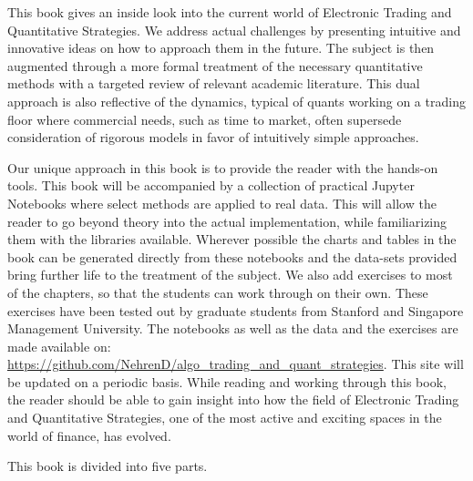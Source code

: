 This book gives an inside look into the current world of Electronic Trading and Quantitative Strategies. We address actual challenges by presenting intuitive and innovative ideas on how to approach them in the future. The subject is then augmented through a more formal treatment of the necessary quantitative methods with a targeted review of relevant academic literature. This dual approach is also reflective of the dynamics, typical of quants working on a trading floor where commercial needs, such as time to market, often supersede consideration of rigorous models in favor of intuitively simple approaches. 


Our unique approach in this book is to provide the reader with the hands-on tools. This book will be accompanied by a collection of practical Jupyter Notebooks where select methods are applied to real data. This will allow the reader to go beyond theory into the actual implementation, while familiarizing them with the libraries available. Wherever possible the charts and tables in the book can be generated directly from these notebooks and the data-sets provided bring further life to the treatment of the subject. We also add exercises to most of the chapters, so that the students can work through on their own. These exercises have been tested out by graduate students from Stanford and Singapore Management University. The notebooks as well as the data and the exercises are made  available on: \url{https://github.com/NehrenD/algo_trading_and_quant_strategies}. This site will be updated on a periodic basis. While reading and working through this book, the reader should be able to gain insight into how the field of Electronic Trading and Quantitative Strategies, one of the most active and exciting spaces in the world of finance, has evolved.


This book is divided into five parts. 

